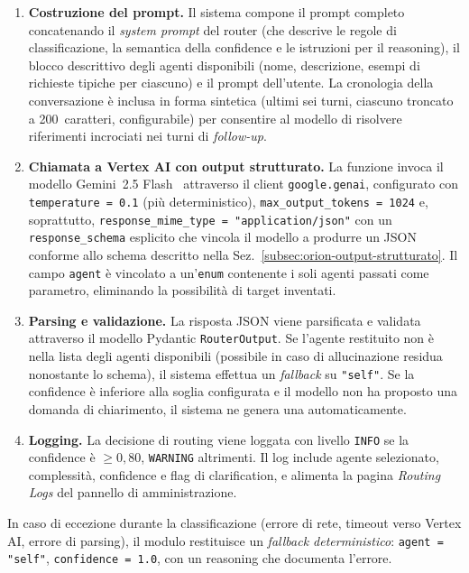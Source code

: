 \begin{enumerate}
  \item \textbf{Costruzione del prompt.} Il sistema compone il prompt completo 
  concatenando il \emph{system prompt} del router (che descrive le regole di classificazione, 
  la semantica della confidence e le istruzioni per il reasoning), 
  il blocco descrittivo degli agenti disponibili (nome, descrizione, esempi di richieste tipiche per ciascuno) 
  e il prompt dell'utente. La cronologia della conversazione è inclusa in forma sintetica 
  (ultimi sei turni, ciascuno troncato a 200~caratteri, configurabile) per consentire al modello di risolvere 
  riferimenti incrociati nei turni di \emph{follow-up}.

  \item \textbf{Chiamata a Vertex AI con output strutturato.} La funzione invoca il modello Gemini~2.5 Flash~\cite{team2024gemini} 
  attraverso il client \texttt{google.genai}, configurato con \texttt{temperature = 0.1} (più deterministico), \texttt{max\_output\_tokens = 1024} e, 
  soprattutto, \texttt{response\_mime\_type = "application/json"} con un \texttt{response\_schema} esplicito che vincola il modello a produrre un JSON 
  conforme allo schema descritto nella Sez.~\ref{subsec:orion-output-strutturato}. 
  Il campo \texttt{agent} è vincolato a un'\texttt{enum} contenente i soli agenti passati come parametro, eliminando la possibilità di target inventati.

  \item \textbf{Parsing e validazione.} La risposta JSON viene parsificata e 
  validata attraverso il modello Pydantic \texttt{RouterOutput}. 
  Se l'agente restituito non è nella lista degli agenti disponibili (possibile in caso di allucinazione residua nonostante lo schema), 
  il sistema effettua un \emph{fallback} su \texttt{"self"}. Se la confidence è inferiore alla soglia configurata e il modello non ha proposto una domanda di chiarimento, 
  il sistema ne genera una automaticamente.

  \item \textbf{Logging.} La decisione di routing viene loggata con livello \texttt{INFO} 
  se la confidence è $\geq 0{,}80$, \texttt{WARNING} altrimenti. Il log include agente selezionato, complessità, 
  confidence e flag di clarification, e alimenta la pagina \emph{Routing Logs} del pannello di amministrazione.
\end{enumerate}

In caso di eccezione durante la classificazione (errore di rete, timeout verso Vertex AI, errore di parsing), 
il modulo restituisce un \emph{fallback deterministico}: \texttt{agent = "self"}, \texttt{confidence = 1.0}, 
con un reasoning che documenta l'errore.

